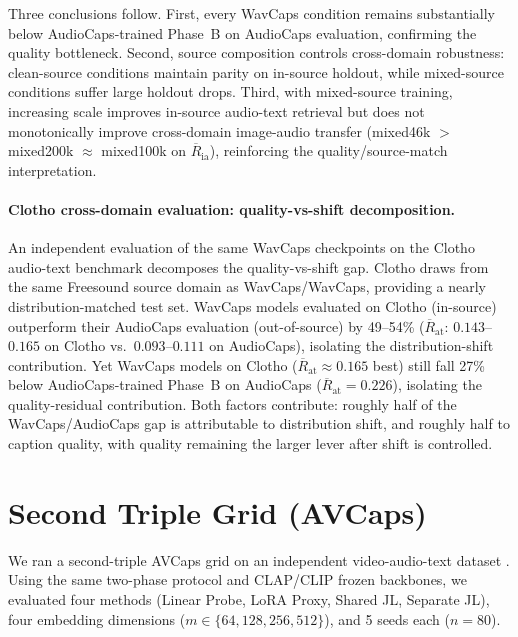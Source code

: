 \documentclass{article}
\newcommand{\avgR}{\overline{R}}
\begin{document}
Three conclusions follow.
First, every WavCaps condition remains substantially below AudioCaps-trained Phase~B on AudioCaps evaluation, confirming the quality bottleneck.
Second, source composition controls cross-domain robustness: clean-source conditions maintain parity on in-source holdout, while mixed-source conditions suffer large holdout drops.
Third, with mixed-source training, increasing scale improves in-source audio-text retrieval but does not monotonically improve cross-domain image-audio transfer (mixed46k $>$ mixed200k $\approx$ mixed100k on $\avgR_\mathrm{ia}$), reinforcing the quality/source-match interpretation.

\paragraph{Clotho cross-domain evaluation: quality-vs-shift decomposition.}
An independent evaluation of the same WavCaps checkpoints on the Clotho audio-text benchmark \citep{drossos2019clotho} decomposes the quality-vs-shift gap.
Clotho draws from the same Freesound source domain as WavCaps/WavCaps, providing a nearly distribution-matched test set.
WavCaps models evaluated on Clotho (in-source) outperform their AudioCaps evaluation (out-of-source) by 49--54\% ($\avgR_\mathrm{at}$: $0.143$--$0.165$ on Clotho vs.\ $0.093$--$0.111$ on AudioCaps), isolating the distribution-shift contribution.
Yet WavCaps models on Clotho ($\avgR_\mathrm{at} \approx 0.165$ best) still fall 27\% below AudioCaps-trained Phase~B on AudioCaps ($\avgR_\mathrm{at} = 0.226$), isolating the quality-residual contribution.
Both factors contribute: roughly half of the WavCaps/AudioCaps gap is attributable to distribution shift, and roughly half to caption quality, with quality remaining the larger lever after shift is controlled.

\section{Second Triple Grid (AVCaps)}
\label{app:secondtriple}

We ran a second-triple AVCaps grid on an independent video-audio-text dataset \citep{sudarsanam2025avcaps}.
Using the same two-phase protocol and CLAP/CLIP frozen backbones, we evaluated four methods (Linear Probe, LoRA Proxy, Shared JL, Separate JL), four embedding dimensions ($m\in\{64,128,256,512\}$), and 5 seeds each ($n=80$).
\end{document}
